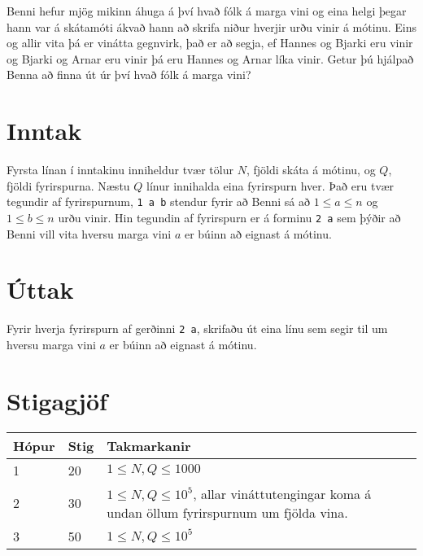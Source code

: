 Benni hefur mjög mikinn áhuga á því hvað fólk á marga vini og eina helgi þegar hann var á skátamóti ákvað hann
að skrifa niður hverjir urðu vinir á mótinu. Eins og allir vita þá er vinátta gegnvirk, það er að segja, ef 
Hannes og Bjarki eru vinir og Bjarki og Arnar eru vinir þá eru Hannes og Arnar líka vinir. Getur þú hjálpað
Benna að finna út úr því hvað fólk á marga vini?

\section*{Inntak}
Fyrsta línan í inntakinu inniheldur tvær tölur $N$, fjöldi skáta á mótinu, og $Q$, fjöldi fyrirspurna.
Næstu $Q$ línur innihalda eina fyrirspurn hver. Það eru tvær tegundir af fyrirspurnum, \texttt{1 a b}
stendur fyrir að Benni sá að $1 \leq a \leq n$ og $1 \leq b \leq n$ urðu vinir.
Hin tegundin af fyrirspurn er á forminu \texttt{2 a} sem
þýðir að Benni vill vita hversu marga vini $a$ er búinn að eignast á mótinu.

\section*{Úttak}
Fyrir hverja fyrirspurn af gerðinni \texttt{2 a}, skrifaðu út eina línu sem segir til um hversu marga
vini $a$ er búinn að eignast á mótinu.

\section*{Stigagjöf}
\begin{tabular}{|l|l|l|l|}
\hline
Hópur & Stig & Takmarkanir \\ \hline
1     & 20   & $1 \leq N,Q \leq 1000$\\\hline
2     & 30   & $1 \leq N,Q \leq 10^5$, allar vináttutengingar koma á undan öllum fyrirspurnum um fjölda vina.\\\hline
3     & 50   & $1 \leq N,Q \leq 10^5$\\\hline
\end{tabular}
